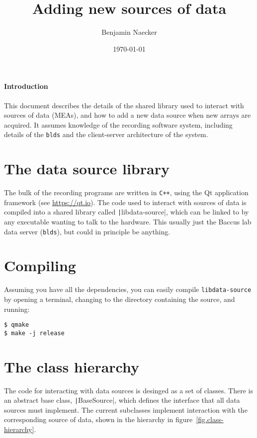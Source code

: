 \documentclass[12pt]{article}
\title{Adding new sources of data}
\author{Benjamin Naecker}
\date{\today}
\begin{document}
\maketitle

\paragraph{Introduction} This document describes the details of the shared library used to 
interact with sources of data (MEAs), and how to add a new data source
when new arrays are acquired. It assumes knowledge of the recording software system,
including details of the \texttt{blds} and the client-server architecture of the system.

\section*{The data source library}

The bulk of the recording programs are written in \texttt{C++}, using the Qt application
framework (see \url{https://qt.io}). The code used to interact with sources of data
is compiled into a shared library called \texttt|libdata-source|, which
can be linked to by any executable wanting to talk to the hardware. This usually just
the Baccus lab data server (\texttt{blds}), but could in principle be anything.

\section*{Compiling}

Assuming you have all the dependencies, you can easily compile \texttt{libdata-source}
by opening a terminal, changing to the directory containing the source, and running:

\begin{verbatim}
$ qmake
$ make -j release
\end{verbatim}

\section*{The class hierarchy}

The code for interacting with data sources is desinged as a set of classes. There is
an abstract base class, \texttt|BaseSource|, which defines the interface that
all data sources must implement. The current subclasses implement interaction
with the corresponding source of data, shown in the hierarchy in 
figure~\ref{fig.class-hierarchy}.
\end{document}
